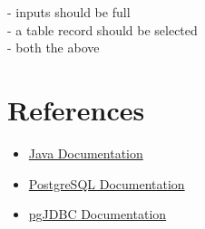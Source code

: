\documentclass[12pt]{article}
\begin{document}
\noindent \text{*} - inputs should be full\\
\text{**} - a table record should be selected\\
\text{***} - both the above

\pagebreak

\section{References}
\begin{itemize}
    \item \href{https://docs.oracle.com/en/java/}{Java Documentation}
    \item \href{https://www.postgresql.org/docs/}{PostgreSQL Documentation}
    \item \href{https://jdbc.postgresql.org/documentation/}{pgJDBC Documentation}
\end{itemize}
\end{document}
